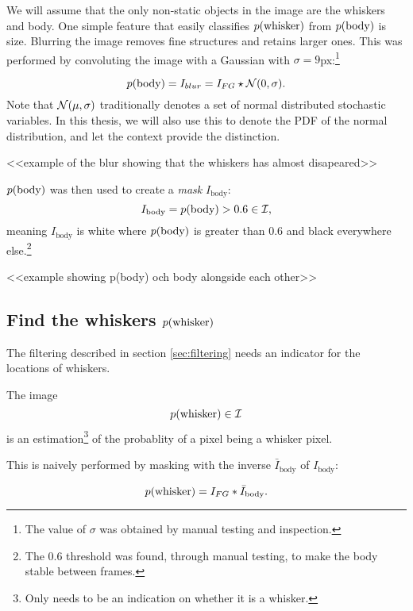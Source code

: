 We will assume that the only non-static objects in the image are the
whiskers and body. One simple feature that easily classifies
$p{(\text{whisker})}$ from $p{(\text{body})}$ is size. Blurring
the image removes fine structures and retains larger ones.  This was
performed by convoluting the image with a Gaussian with
${\sigma=9}$px:\footnote{The value of $\sigma$ was obtained by manual
  testing and inspection.}

\begin{equation}
  p{(\text{body})} = I_{blur} = I_{FG} \star \mathcal{N}{\left(0, \sigma\right)}.
\end{equation}
Note that $\mathcal{N}{\left(\mu, \sigma\right)}$ traditionally denotes a set of normal
distributed stochastic variables. In this thesis, we will also use
this to denote the PDF of the normal distribution, and let the context
provide the distinction.

<<example of the blur showing that the whiskers has almost disapeared>>

$p{(\text{body})}$ was then used to create a \emph{mask} $I_{\text{body}}$:
\begin{equation}
  I_{\text{body}} = p{(\text{body})}>0.6 \in \mathcal{I},
\end{equation}
meaning $I_{\text{body}}$ is white where $p{(\text{body})}$ is greater than
0.6 and black everywhere else.\footnote{The 0.6 threshold was found,
  through manual testing, to make the body stable between frames.}

<<example showing p(body) och body alongside each other>>

\subsection{Find the whiskers $p{(\text{whisker})}$}
The filtering described in section \ref{sec:filtering} needs an
indicator for the locations of whiskers.

\begin{definition}
  The image
  \begin{equation}
    p{(\text{whisker})}\in \mathcal{I}
  \end{equation} is an estimation\footnote{Only needs to be an
    indication on whether it is a whisker.} of the probablity of a
  pixel being a whisker pixel.
\end{definition}

This is naively performed by masking with the inverse
$\bar{I}_{\text{body}}$ of $I_{\text{body}}$:

\begin{equation}
  p{(\text{whisker})} = I_{FG} * \bar{I}_{\text{body}}.
\end{equation}

